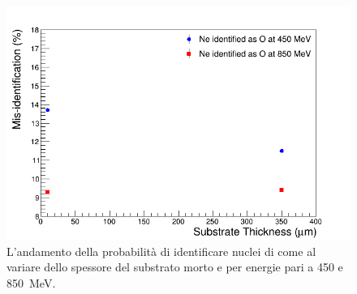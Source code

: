 \begin{figure} [!t]
	\centering
	\includegraphics[width=\textwidth, keepaspectratio]{Grafici_Tesi/Substrato/misident_substrate.png}
	\caption{L'andamento della probabilità di identificare nuclei di  come  al variare dello spessore del substrato morto e per energie pari a 450 e 850~MeV.} \label{fig:misident_vs_substrate}
\end{figure}





\clearpage
\subsection{}













